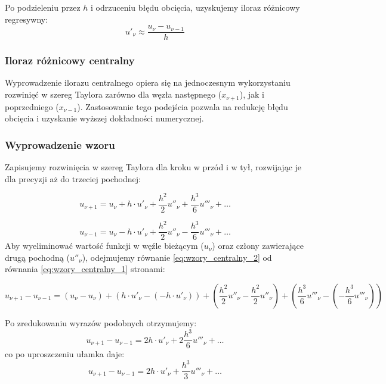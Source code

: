 \documentclass[a4paper,14pt]{scrartcl}
\begin{document}
Po podzieleniu przez $h$ i odrzuceniu błędu obcięcia, uzyskujemy iloraz różnicowy regresywny:
\begin{equation*}
    u'_\nu \approx \frac{u_\nu - u_{\nu-1}}{h}
\end{equation*}

\newpage
\subsubsection{Iloraz różnicowy centralny}
Wyprowadzenie ilorazu centralnego opiera się na jednoczesnym wykorzystaniu rozwinięć w szereg Taylora zarówno dla węzła następnego ($x_{\nu+1}$), jak i poprzedniego ($x_{\nu-1}$). Zastosowanie tego podejścia pozwala na redukcję błędu obcięcia i uzyskanie wyższej dokładności numerycznej.

\subsubsection*{Wyprowadzenie wzoru}
Zapisujemy rozwinięcia w szereg Taylora dla kroku w przód i w tył, rozwijając je dla precyzji aż do trzeciej pochodnej:

\begin{equation}
    \label{eq:wzory_centralny_1}
    u_{\nu+1} = u_\nu + h \cdot u'_\nu + \frac{h^2}{2}u''_\nu + \frac{h^3}{6}u'''_\nu + \dots
\end{equation}

\begin{equation}
    \label{eq:wzory_centralny_2}
    u_{\nu-1} = u_\nu - h \cdot u'_\nu + \frac{h^2}{2}u''_\nu - \frac{h^3}{6}u'''_\nu + \dots
\end{equation}
Aby wyeliminować wartość funkcji w węźle bieżącym ($u_\nu$) oraz człony zawierające drugą pochodną ($u''_\nu$), odejmujemy równanie \eqref{eq:wzory_centralny_2} od równania \eqref{eq:wzory_centralny_1} stronami:

\begin{equation*}
    u_{\nu+1} - u_{\nu-1} = (u_\nu - u_\nu) + (h \cdot u'_\nu - (-h \cdot u'_\nu)) + \left(\frac{h^2}{2}u''_\nu - \frac{h^2}{2}u''_\nu\right) + \left(\frac{h^3}{6}u'''_\nu - \left(-\frac{h^3}{6}u'''_\nu\right)\right)
\end{equation*}


Po zredukowaniu wyrazów podobnych otrzymujemy: $$u_{\nu+1} - u_{\nu-1} = 2h \cdot u'_\nu + 2\frac{h^3}{6}u'''_\nu + \dots$$
co po uproszczeniu ułamka daje: $$u_{\nu+1} - u_{\nu-1} = 2h \cdot u'_\nu + \frac{h^3}{3}u'''_\nu + \dots$$
\end{document}
